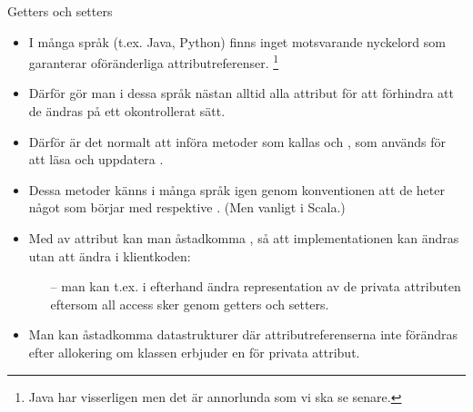 
\begin{Slide}{Getters och setters}\SlideFontSmall
\begin{itemize}
\item I många språk (t.ex. Java, Python) finns inget motsvarande nyckelord  som garanterar oföränderliga attributreferenser.
\footnote{Java har visserligen  men det är annorlunda som vi ska se senare.}

\item Därför gör man i dessa språk nästan alltid alla attribut  för att förhindra att de ändras på ett okontrollerat sätt.


\item Därför är det normalt att införa metoder som kallas  och , som används för att  läsa och uppdatera .

\item Dessa metoder känns i många språk igen genom konventionen att de heter något som börjar med  respektive . (Men  vanligt i Scala.)

\item Med  av attribut kan man åstadkomma , så att implementationen kan ändras utan att ändra i klientkoden:
\begin{itemize}\SlideFontSmall
\item[--] man kan t.ex. i efterhand ändra representation av de privata attributen eftersom all access sker genom getters och setters.
\end{itemize}

\item Man kan åstadkomma  datastrukturer där attributreferenserna inte förändras efter allokering om klassen  erbjuder en  för privata attribut.
\end{itemize}
\end{Slide}




